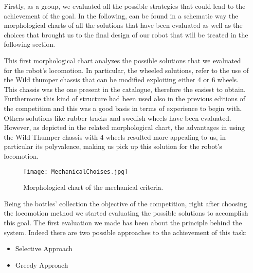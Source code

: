 Firstly, as a group, we evaluated all the possible strategies that could lead to the achievement of the goal.
In the following, can be found in a schematic way the morphological charts of all the solutions that have been evaluated as well as the choices that brought us to the final design of our robot that will be treated in the following section.

This first morphological chart analyzes the possible solutions that we evaluated for the robot’s locomotion. In particular, the wheeled solutions, refer to the use of the Wild thumper chassis that can be modified exploiting either 4 or 6 wheels. This chassis was the one present in the catalogue, therefore the easiest to obtain. Furthermore this kind of structure had been used also in the previous editions of the competition and this was a good basis in terms of experience to begin with.
Others solutions like rubber tracks and swedish wheels have been evaluated.
However, as depicted in the related morphological chart, the advantages in using the Wild Thumper chassis with 4 wheels resulted more appealing to us, in particular its polyvalence, making us pick up this solution for the robot’s locomotion.

\begin{figure}[H]
 \centering
 \texttt{[image: MechanicalChoises.jpg]}
 \caption{Morphological chart of the mechanical criteria.}
\label{fig:MechanicalChoises}
\end{figure}

Being the bottles’ collection the objective of the competition, right after choosing the locomotion method we started evaluating the possible solutions to accomplish this goal.
The first evaluation we made has been about the principle behind the system.
Indeed there are two possible approaches to the achievement of this task:

\begin{itemize}
\item Selective Approach
\item Greedy Approach
\end{itemize}

